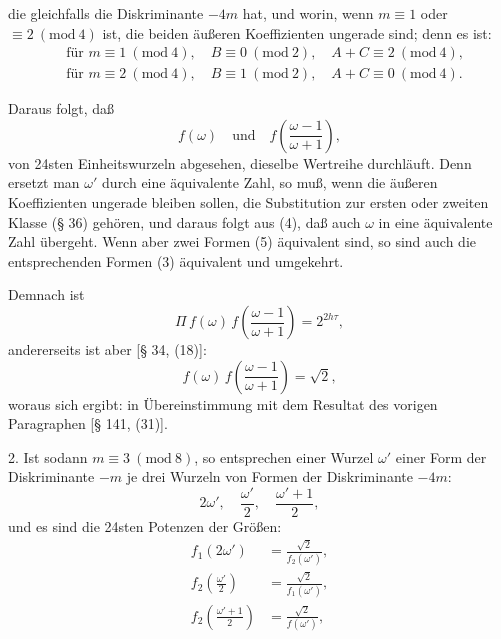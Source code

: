 die gleichfalls die Diskriminante $-4m$ hat, und worin, wenn $m \equiv 1$
oder $\equiv 2\ (\mathrm{mod}\ 4)$ ist, die beiden äußeren Koeffizienten
ungerade sind; denn es ist:
\[
\begin{aligned}
&\text{für } m \equiv 1\ (\mathrm{mod}\ 4), \quad B \equiv 0\ (\mathrm{mod}\ 2), \quad A+C \equiv 2\ (\mathrm{mod}\ 4),\\
&\text{für } m \equiv 2\ (\mathrm{mod}\ 4), \quad B \equiv 1\ (\mathrm{mod}\ 2), \quad A+C \equiv 0\ (\mathrm{mod}\ 4).
\end{aligned}
\]

Daraus folgt, daß
\[
f(\omega) \quad\text{und}\quad f\left(\dfrac{\omega-1}{\omega+1}\right),
\]
von 24sten Einheitswurzeln abgesehen, dieselbe Wertreihe durchläuft.
Denn ersetzt man $\omega'$ durch eine äquivalente Zahl, so muß, wenn die
äußeren Koeffizienten ungerade bleiben sollen, die Substitution zur
ersten oder zweiten Klasse (§ 36) gehören, und daraus folgt aus (4), daß
auch $\omega$ in eine äquivalente Zahl übergeht. Wenn aber zwei Formen
(5) äquivalent sind, so sind auch die entsprechenden Formen (3) äquivalent
und umgekehrt.

Demnach ist
\[
\Pi\, f(\omega)\, f\!\left(\frac{\omega-1}{\omega+1}\right) = 2^{2h\tau},
\]
andererseits ist aber [§ 34, (18)]:
\[
f(\omega)\, f\!\left(\frac{\omega-1}{\omega+1}\right) = \sqrt{2},
\]
woraus sich ergibt:
in Übereinstimmung mit dem Resultat des vorigen Paragraphen [§ 141, (31)].

2. Ist sodann $m \equiv 3\ (\mathrm{mod}\ 8)$, so entsprechen einer Wurzel
$\omega'$ einer Form der Diskriminante $-m$ je drei Wurzeln von Formen der
Diskriminante $-4m$:
\[
2\omega', \quad \frac{\omega'}{2}, \quad \frac{\omega'+1}{2},
\]
und es sind die 24sten Potenzen der Größen:
\[
\begin{aligned}
f_1(2\omega') &= \frac{\sqrt{2}}{f_2(\omega')},\\
f_2\!\left(\frac{\omega'}{2}\right) &= \frac{\sqrt{2}}{f_1(\omega')},\\
f_2\!\left(\frac{\omega'+1}{2}\right) &= \frac{\sqrt{2}}{f(\omega')},
\end{aligned}
\]
